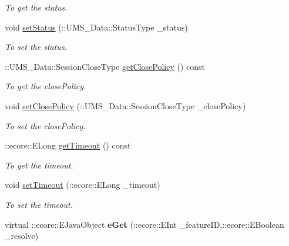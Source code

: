 \begin{DoxyCompactItemize}
\begin{DoxyCompactList}\small\item\em To get the status. \item\end{DoxyCompactList}\item 
void \hyperlink{classUMS__Data_1_1Session_a52b1b11a3b1f059d33b13ee598b51b6a}{setStatus} (::UMS\_\-Data::StatusType \_\-status)
\begin{DoxyCompactList}\small\item\em To set the status. \item\end{DoxyCompactList}\item 
::UMS\_\-Data::SessionCloseType \hyperlink{classUMS__Data_1_1Session_ab71abe11c366639d6866c228f2f0b152}{getClosePolicy} () const 
\begin{DoxyCompactList}\small\item\em To get the closePolicy. \item\end{DoxyCompactList}\item 
void \hyperlink{classUMS__Data_1_1Session_a6e121db6af0c9b07cd0d08f776849989}{setClosePolicy} (::UMS\_\-Data::SessionCloseType \_\-closePolicy)
\begin{DoxyCompactList}\small\item\em To set the closePolicy. \item\end{DoxyCompactList}\item 
::ecore::ELong \hyperlink{classUMS__Data_1_1Session_a5324cf515cbffba9bdfd41a806aa0ae0}{getTimeout} () const 
\begin{DoxyCompactList}\small\item\em To get the timeout. \item\end{DoxyCompactList}\item 
void \hyperlink{classUMS__Data_1_1Session_a529cb899ba3911286cfb8ccccaff92ca}{setTimeout} (::ecore::ELong \_\-timeout)
\begin{DoxyCompactList}\small\item\em To set the timeout. \item\end{DoxyCompactList}\item 
\hypertarget{classUMS__Data_1_1Session_aea87353802f475682173a5ad5c3d7929}{
virtual ::ecore::EJavaObject {\bfseries eGet} (::ecore::EInt \_\-featureID,::ecore::EBoolean \_\-resolve)}
\label{classUMS__Data_1_1Session_aea87353802f475682173a5ad5c3d7929}


\end{DoxyCompactItemize}
